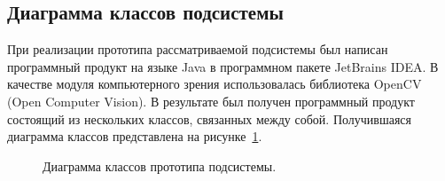 

\subsection{Диаграмма классов подсистемы}
При реализации прототипа рассматриваемой подсистемы был написан программный продукт на  языке Java в программном пакете JetBrains IDEA. В качестве модуля компьютерного зрения использовалась библиотека OpenCV (Open Computer Vision). 
В результате был получен программный продукт состоящий из нескольких классов, связанных между собой. Получившаяся диаграмма классов представлена на рисунке~\ref{pic:classDiagram}.


\begin{figure}[!htb]
\caption{Диаграмма классов прототипа подсистемы.}
\label{pic:classDiagram}
\end{figure}